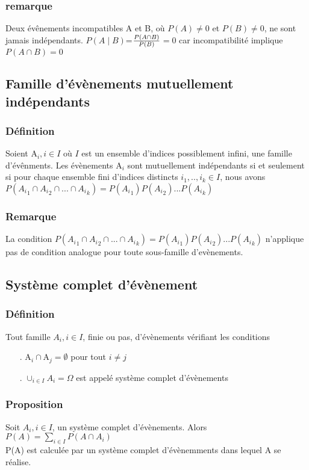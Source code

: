 \documentclass{article}
\begin{document}
            \subsubsection{remarque}
                Deux évênements incompatibles A et B, où $P(A) \neq 0$ et $P(B) \neq 0$, ne sont jamais indépendants.
                $P(A \mid B)$=${P(A \cap B)}\over{P(B)}$$=0$ car incompatibilité implique $P(A\cap B)=0$
        \subsection{Famille d'évènements mutuellement indépendants}
            \subsubsection{Définition}
                Soient A$_i, i \in I$ où $I$ est un ensemble d'indices possiblement infini, une famille d'évênments.
                Les évènements A$_i$ sont mutuellement indépendants si et seulement si pour chaque ensemble fini d'indices
                distincts $i_1,..,i_k \in I$, nous avons
                $P({A_i}_{1} \cap {A_i}_{2} \cap ... \cap {A_i}_{k}) = P({A_i}_{1})P({A_i}_{2})...P({A_i}_{k})$
            \subsubsection{Remarque}
                La condition $P({A_i}_{1} \cap {A_i}_{2} \cap ... \cap {A_i}_{k}) = P({A_i}_{1})P({A_i}_{2})...P({A_i}_{k})$
                n'applique pas de condition analogue pour toute sous-famille d’evènements.
        \subsection{Système complet d'évènement}
            \subsubsection{Définition}
                Tout famille $A_i, i \in I$, finie ou pas, d'évènements vérifiant les conditions
                \begin{itemize}
                    \item[.] A$_i \cap$A$_j=\emptyset$ pour tout $i \neq j$
                    \item[.] $\cup_{i \in I} A_i=\Omega$
                    est appelé système complet d'évènements
                \end{itemize}
            \subsubsection{Proposition}
                Soit $A_i, i \in I$, un système complet d'évènements. Alors $P(A)=\sum_{i\in I}P(A\cap A_i)$\\
                P(A) est calculée par un système complet d'évènemments dans lequel A se réalise.
\end{document}
